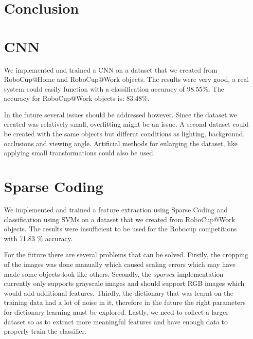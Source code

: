 \documentclass[	DIV=calc,%
				paper=a4,%
				fontsize=11pt,%
				twocolumn]{scrartcl}	 %
\begin{document}
\section{Conclusion}

\section*{CNN}
We implemented and trained a CNN on a dataset that we created from RoboCup@Home and RoboCup@Work objects. The results were very good, a real system could easily function with a classification accuracy of 98.55\%. The accuracy for RoboCup@Work objects is: 83.48\%.

In the future several issues should be addressed however. Since the dataset we created was relatively small, overfitting might be an issue. A second dataset could be created with the same objects but differnt conditions as lighting, background, occlusions and viewing angle. Artificial methods for enlarging the dataset, like applying small transformations could also be used.

\section*{Sparse Coding}
We implemented and trained a feature extraction using Sparse Coding and classification using SVMs on a dataset that we created from RoboCup@Work objects. The results were insufficient to be used for the Robocup competitions with 71.83 \% accuracy.

For the future there are several problems that can be solved. Firstly, the cropping of the images was done manually which caused scaling errors which may have made some objects look like others. Secondly, the \textit{sparsex} implementation currently only supports grayscale images and should support RGB images which would add additional features. Thirdly, the dictionary that was learnt on the training data had a lot of noise in it, therefore in the future the right parameters for dictionary learning must be explored. Lastly, we need to collect a larger dataset so as to extract more meaningful features and have enough data to properly train the classifier.

\onecolumn
\end{document}
